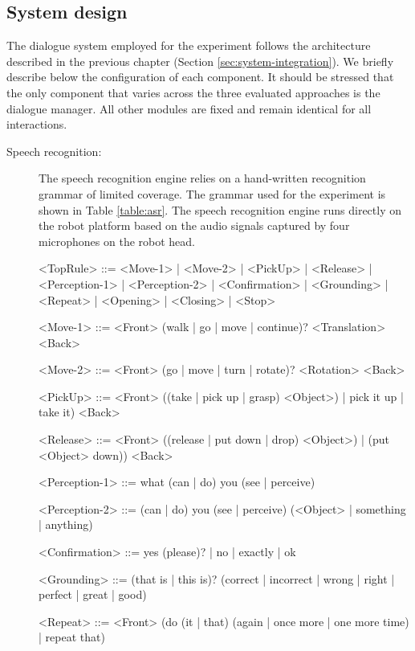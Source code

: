 \subsection{System design}

The dialogue system employed for the experiment follows the architecture described in the previous chapter (Section \ref{sec:system-integration}).  We briefly describe below the configuration of each component. It should be stressed that the only component that varies across the three evaluated approaches is the dialogue manager.  All other modules are fixed and remain identical for all interactions.

\begin{description}
\item[Speech recognition: ] The speech recognition engine relies on a hand-written recognition grammar of limited coverage. The grammar used for the experiment is shown in Table \ref{table:asr}.  The speech recognition engine runs directly on the robot platform based on the audio signals captured by four microphones on the robot head.


\begin{table}[p!]
\vspace{2cm}
\begin{grammar}

<TopRule> ::= <Move-1> | <Move-2> | <PickUp> | <Release> | <Perception-1> | <Perception-2> | <Confirmation> | <Grounding> | <Repeat> | <Opening> | <Closing> | <Stop> 

<Move-1> ::= <Front> (walk | go | move | continue)? <Translation> <Back>

<Move-2> ::= <Front> (go | move | turn | rotate)? <Rotation> <Back>

<PickUp> ::= <Front> ((take | pick up | grasp) <Object>) | pick it up | take it) <Back>

<Release> ::= <Front> ((release | put down | drop) <Object>) | (put <Object> down)) <Back> 

<Perception-1> ::= what (can | do) you (see | perceive)

<Perception-2> ::= (can | do) you (see | perceive) (<Object> | something | anything)

<Confirmation> ::= yes (please)? | no | exactly | ok 

<Grounding> ::= (that is | this is)? (correct  | incorrect | wrong | right | perfect | great | good) 

<Repeat> ::= <Front> (do (it | that) (again | once more | one more time) | repeat that)


\end{grammar}
\end{table}
\end{description}
